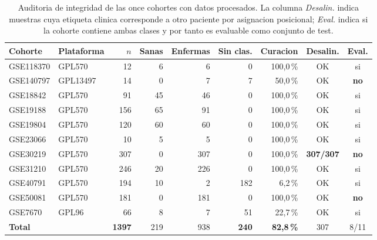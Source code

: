 \begin{table}[htbp]
\centering
\caption[Auditoria de integridad de las cohortes]{Auditoria de integridad de
las once cohortes con datos procesados. La columna \emph{Desalin.} indica
muestras cuya etiqueta clinica corresponde a otro paciente por asignacion
posicional; \emph{Eval.} indica si la cohorte contiene ambas clases y por
tanto es evaluable como conjunto de test.}
\label{tab:auditoria}
\small
\begin{tabular}{llrrrrrcc}
\toprule
Cohorte & Plataforma & $n$ & Sanas & Enfermas & Sin clas. & Curacion & Desalin. & Eval. \\
\midrule
GSE118370 & GPL570 & 12 & 6 & 6 & 0 & 100,0\,\% & OK & si \\
GSE140797 & GPL13497 & 14 & 0 & 7 & 7 & 50,0\,\% & OK & \textbf{no} \\
GSE18842 & GPL570 & 91 & 45 & 46 & 0 & 100,0\,\% & OK & si \\
GSE19188 & GPL570 & 156 & 65 & 91 & 0 & 100,0\,\% & OK & si \\
GSE19804 & GPL570 & 120 & 60 & 60 & 0 & 100,0\,\% & OK & si \\
GSE23066 & GPL570 & 10 & 5 & 5 & 0 & 100,0\,\% & OK & si \\
GSE30219 & GPL570 & 307 & 0 & 307 & 0 & 100,0\,\% & \textbf{307/307} & \textbf{no} \\
GSE31210 & GPL570 & 246 & 20 & 226 & 0 & 100,0\,\% & OK & si \\
GSE40791 & GPL570 & 194 & 10 & 2 & 182 & 6,2\,\% & OK & si \\
GSE50081 & GPL570 & 181 & 0 & 181 & 0 & 100,0\,\% & OK & \textbf{no} \\
GSE7670 & GPL96 & 66 & 8 & 7 & 51 & 22,7\,\% & OK & si \\
\midrule
\textbf{Total} & & \textbf{1397} & 219 &
938 & \textbf{240} &
\textbf{82,8\,\%} & 307 & 8/11 \\
\bottomrule
\end{tabular}
\end{table}
